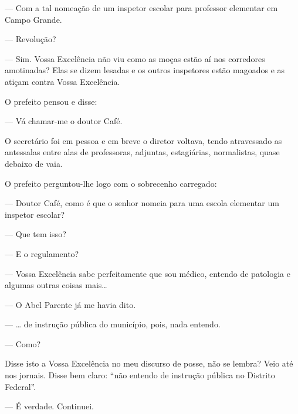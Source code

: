 --- Com a tal nomeação de um inspetor escolar para professor elementar
em Campo Grande.

--- Revolução?

--- Sim. Vossa Excelência não viu como as moças estão aí nos corredores
amotinadas? Elas se dizem lesadas e os outros inspetores estão magoados
e as atiçam contra Vossa Excelência.

O prefeito pensou e disse:

--- Vá chamar-me o doutor Café.

O secretário foi em pessoa e em breve o diretor voltava, tendo
atravessado as antessalas entre alas de professoras, adjuntas,
estagiárias, normalistas, quase debaixo de vaia.

O prefeito perguntou-lhe logo com o sobrecenho carregado:

--- Doutor Café, como é que o senhor nomeia para uma escola elementar um
inspetor escolar?

--- Que tem isso?

--- E o regulamento?

--- Vossa Excelência sabe perfeitamente que sou médico, entendo de
patologia e algumas outras coisas mais\ldots{}

--- O Abel Parente já me havia dito.

--- \ldots{} de instrução pública do município, pois, nada entendo.

--- Como?

Disse isto a Vossa Excelência no meu discurso de posse, não se lembra?
Veio até nos jornais. Disse bem claro: ``não entendo de instrução
pública no Distrito Federal''.

--- É verdade. Continuei.

\blankpage

